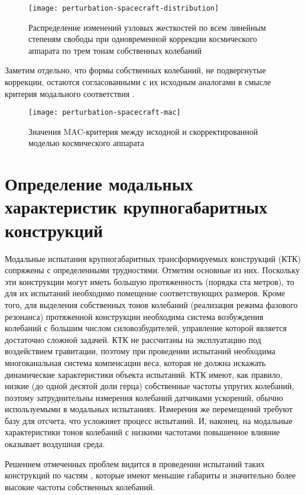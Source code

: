 \begin{figure}[H]
	\centering
	\texttt{[image: perturbation-spacecraft-distribution]}
	\caption{Распределение изменений узловых жесткостей по всем линейным степеням свободы при одновременной коррекции космического аппарата по трем тонам собственных колебаний} \label{fig:perturbation-spacecraft-distribution}
\end{figure}

Заметим отдельно, что формы собственных колебаний, не подвергнутые коррекции, остаются согласованными с их исходным аналогами в смысле критерия модального соответствия .

\begin{figure}[H]
	\centering
	\texttt{[image: perturbation-spacecraft-mac]}
	\caption{Значения MAC-критерия между исходной и скорректированной моделью космического аппарата} \label{fig:perturbation-spacecraft-mac}
\end{figure}

\section{Определение модальных характеристик крупногабаритных конструкций}

Модальные испытания крупногабаритных трансформируемых конструкций (КТК) сопряжены с определенными трудностями. Отметим основные из них. Поскольку эти конструкции могут иметь большую протяженность (порядка ста метров), то для их испытаний необходимо помещение соответствующих размеров. Кроме того, для выделения собственных тонов колебаний (реализация режима фазового резонанса) протяженной конструкции необходима система возбуждения колебаний с большим числом силовозбудителей, управление которой является достаточно сложной задачей. КТК не рассчитаны на эксплуатацию под воздействием гравитации, поэтому при проведении испытаний необходима многоканальная система компенсации веса, которая не должна искажать динамические характеристики объекта испытаний. КТК имеют, как правило, низкие (до одной десятой доли герца) собственные частоты упругих колебаний, поэтому затруднительны измерения колебаний датчиками ускорений, обычно используемыми в модальных испытаниях. Измерения же перемещений требуют базу для отсчета, что усложняет процесс испытаний. И, наконец, на модальные характеристики тонов колебаний с низкими частотами повышенное влияние оказывает воздушная среда. 

Решением отмеченных проблем видится в проведении испытаний таких конструкций по частям , которые имеют меньшие габариты и значительно более высокие частоты собственных колебаний. 


